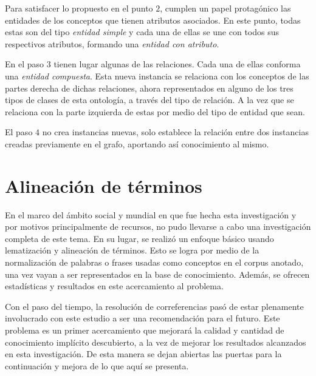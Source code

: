 Para satisfacer lo propuesto en el punto $2$, cumplen un papel protagónico las entidades de los conceptos que tienen atributos asociados. En este punto, todas estas son del tipo \textit{entidad simple} y cada una de ellas se une con todos sus respectivos atributos, formando una \textit{entidad con atributo}.

En el paso $3$ tienen lugar algunas de las relaciones. Cada una de ellas conforma una \textit{entidad compuesta}. Esta nueva instancia se relaciona con los conceptos de las partes derecha de dichas relaciones, ahora representados en alguno de los tres tipos de clases de esta ontología, a través del tipo de relación. A la vez que se relaciona con la parte izquierda de estas por medio del tipo de entidad que sean.

El paso $4$ no crea instancias nuevas, solo establece la relación entre dos instancias creadas previamente en el grafo, aportando así conocimiento al mismo.

\section{Alineación de términos}
En el marco del ámbito social y mundial en que fue hecha esta investigación y por motivos principalmente de recursos, no pudo llevarse a cabo una investigación completa de este tema. En su lugar, se realizó un enfoque básico usando lematización y alineación de términos. Esto se logra por medio de la normalización de palabras o frases usadas como conceptos en el corpus anotado, una vez vayan a ser representados en la base de conocimiento. Además, se ofrecen estadísticas y resultados en este acercamiento al problema. 

Con el paso del tiempo, la resolución de correferencias pasó de estar plenamente involucrado con este estudio a ser una recomendación para el futuro. Este problema es un primer acercamiento que mejorará la calidad y cantidad de conocimiento implícito descubierto, a la vez de mejorar los resultados alcanzados en esta investigación. De esta manera se dejan abiertas las puertas para la continuación y mejora de lo que aquí se presenta.